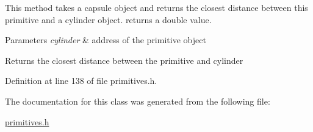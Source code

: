 This method takes a capsule object and returns the closest distance between this primitive and a cylinder object. returns a double value.


\begin{DoxyParams}{Parameters}
{\em cylinder} & address of the primitive object \\
\hline
\end{DoxyParams}
\begin{DoxyReturn}{Returns}
the closest distance between the primitive and cylinder 
\end{DoxyReturn}


Definition at line 138 of file primitives.\+h.



The documentation for this class was generated from the following file\+:\begin{DoxyCompactItemize}
\item 
\hyperlink{primitives_8h}{primitives.\+h}\end{DoxyCompactItemize}
